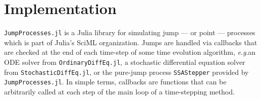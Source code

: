 \documentclass{juliacon}
\numberwithin{equation}{section}
\newcommand{\eg}{\textit{e}.\textit{g}.}
\begin{document}


\section{Implementation} \label{sec:implementation}

\texttt{JumpProcesses.jl} is a Julia library for simulating jump --- or point --- processes which is part of Julia's SciML organization. Jumps are handled via callbacks that are checked at the end of each time-step of some time evolution algorithm, \eg an ODE solver from \texttt{OrdinaryDiffEq.jl}, a stochastic differential equation solver from \texttt{StochasticDiffEq.jl}, or the pure-jump process \texttt{SSAStepper} provided by \texttt{JumpProcesses.jl}. In simple terms, callbacks are functions that can be arbitrarily called at each step of the main loop of a time-stepping method.
\end{document}
